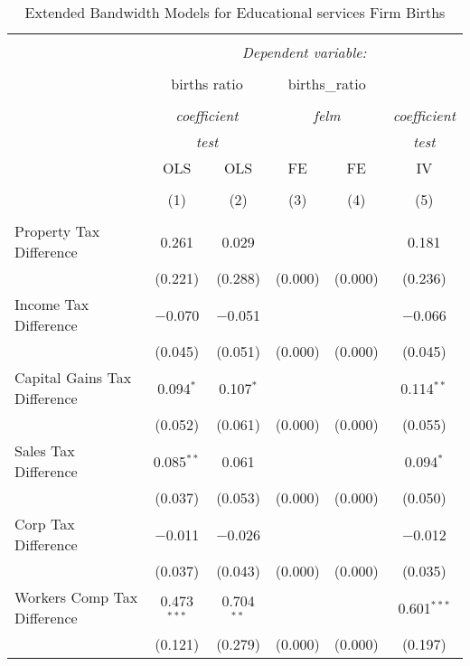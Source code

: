 
\begin{table}[!htbp] \centering 
  \caption{Extended Bandwidth Models for  Educational services Firm Births} 
  \label{} 
\begin{tabular}{@{\extracolsep{5pt}}lccccc} 
\\[-1.8ex]\hline 
\hline \\[-1.8ex] 
 & \multicolumn{5}{c}{\textit{Dependent variable:}} \\ 
\cline{2-6} 
\\[-1.8ex] & \multicolumn{2}{c}{births ratio} & \multicolumn{2}{c}{births\_ratio} &   \\ 
\\[-1.8ex] & \multicolumn{2}{c}{\textit{coefficient}} & \multicolumn{2}{c}{\textit{felm}} & \textit{coefficient} \\ 
 & \multicolumn{2}{c}{\textit{test}} & \multicolumn{2}{c}{\textit{}} & \textit{test} \\ 
 & OLS & OLS & FE & FE & IV \\ 
\\[-1.8ex] & (1) & (2) & (3) & (4) & (5)\\ 
\hline \\[-1.8ex] 
 Property Tax Difference & 0.261 & 0.029 &  &  & 0.181 \\ 
  & (0.221) & (0.288) & (0.000) & (0.000) & (0.236) \\ 
  Income Tax Difference & $-$0.070 & $-$0.051 &  &  & $-$0.066 \\ 
  & (0.045) & (0.051) & (0.000) & (0.000) & (0.045) \\ 
  Capital Gains Tax Difference & 0.094$^{*}$ & 0.107$^{*}$ &  &  & 0.114$^{**}$ \\ 
  & (0.052) & (0.061) & (0.000) & (0.000) & (0.055) \\ 
  Sales Tax Difference & 0.085$^{**}$ & 0.061 &  &  & 0.094$^{*}$ \\ 
  & (0.037) & (0.053) & (0.000) & (0.000) & (0.050) \\ 
  Corp Tax Difference & $-$0.011 & $-$0.026 &  &  & $-$0.012 \\ 
  & (0.037) & (0.043) & (0.000) & (0.000) & (0.035) \\ 
  Workers Comp Tax Difference & 0.473$^{***}$ & 0.704$^{**}$ &  &  & 0.601$^{***}$ \\ 
  & (0.121) & (0.279) & (0.000) & (0.000) & (0.197) \\ 

\end{tabular}
\end{table}
